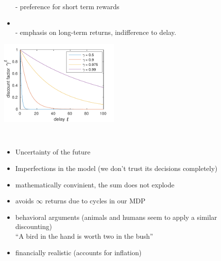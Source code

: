 \begin{frame}
\begin{itemize}
- preference for short term rewards

\item {}\\

- emphasis on long-term returns, indifference to delay.

\end{itemize}


\begin{center}
\includegraphics[width=6cm]{img/delay_discount}
\label{fig:discount}
\end{center}

\end{frame}

\begin{frame}

\\

\begin{itemize}
\item Uncertainty of the future
\item Imperfections in the model (we don't trust its decisions completely)
\item mathematically convinient, the sum does not explode
\item avoids $\infty$ returns due to cycles in our MDP
\item behavioral arguments (animals and humans seem to apply a similar discounting)\\
``A bird in the hand is worth two in the bush''
\item financially realistic (accounts for inflation)
\end{itemize}

\citep{sutton1998introduction}

\end{frame} 

